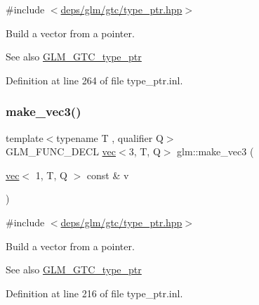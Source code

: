 {\ttfamily \#include $<$\hyperlink{type__ptr_8hpp}{deps/glm/gtc/type\+\_\+ptr.\+hpp}$>$}

Build a vector from a pointer. \begin{DoxySeeAlso}{See also}
\hyperlink{group__gtc__type__ptr}{G\+L\+M\+\_\+\+G\+T\+C\+\_\+type\+\_\+ptr} 
\end{DoxySeeAlso}


Definition at line 264 of file type\+\_\+ptr.\+inl.

\mbox{\label{group__gtc__type__ptr_ga9147e4b3a5d0f4772edfbfd179d7ea0b}} 
\subsubsection{\texorpdfstring{make\+\_\+vec3()}{make\_vec3()}\hspace{0.1cm}{\footnotesize\ttfamily [1/5]}}
{\footnotesize\ttfamily template$<$typename T , qualifier Q$>$ \\
G\+L\+M\+\_\+\+F\+U\+N\+C\+\_\+\+D\+E\+CL \hyperlink{structglm_1_1vec}{vec}$<$3, T, Q$>$ glm\+::make\+\_\+vec3 (\begin{DoxyParamCaption}\item[{\hyperlink{structglm_1_1vec}{vec}$<$ 1, T, Q $>$ const \&}]{v }\end{DoxyParamCaption})\hspace{0.3cm}{\ttfamily [inline]}}



{\ttfamily \#include $<$\hyperlink{type__ptr_8hpp}{deps/glm/gtc/type\+\_\+ptr.\+hpp}$>$}

Build a vector from a pointer. \begin{DoxySeeAlso}{See also}
\hyperlink{group__gtc__type__ptr}{G\+L\+M\+\_\+\+G\+T\+C\+\_\+type\+\_\+ptr} 
\end{DoxySeeAlso}


Definition at line 216 of file type\+\_\+ptr.\+inl.

\mbox{\label{group__gtc__type__ptr_ga482b60a842a5b154d3eed392417a9511}} 
